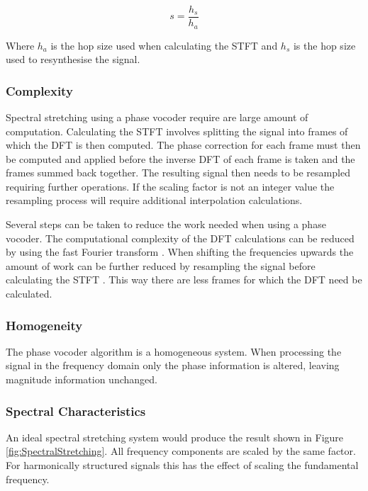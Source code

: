 		\begin{equation}
			s = \frac{h_{s}}{h_{a}}
			\label{eq:PhaseVocoderFactor}
		\end{equation}

		Where $h_{a}$ is the hop size used when calculating the STFT and $h_{s}$ is the hop size used to
		resynthesise the signal.
		
		\subsubsection*{Complexity}
			Spectral stretching using a phase vocoder require are large amount of computation. Calculating the
			STFT involves splitting the signal into frames of which the DFT is then computed. The phase
			correction for each frame must then be computed and applied before the inverse DFT of each frame is
			taken and the frames summed back together. The resulting signal then needs to be resampled
			requiring further operations. If the scaling factor is not an integer value the resampling process
			will require additional interpolation calculations.
		
			Several steps can be taken to reduce the work needed when using a phase vocoder. The computational
			complexity of the DFT calculations can be reduced by using the fast Fourier transform
			\citep{portnoff1976implementation}. When shifting the frequencies upwards the amount of work can be
			further reduced by resampling the signal before calculating the STFT \citep{laroche1999new}. This
			way there are less frames for which the DFT need be calculated.
			
		\subsubsection*{Homogeneity}
			The phase vocoder algorithm is a homogeneous system. When processing the signal in the frequency
			domain only the phase information is altered, leaving magnitude information unchanged. 

		\subsubsection*{Spectral Characteristics}
			An ideal spectral stretching system would produce the result shown in Figure
			\ref{fig:SpectralStretching}. All frequency components are scaled by the same factor. For
			harmonically structured signals this has the effect of scaling the fundamental frequency.

